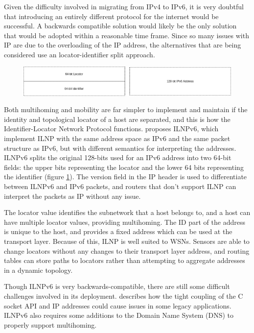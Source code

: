 \documentclass[12pt]{article}
\begin{document}
Given the difficulty involved in migrating from IPv4 to IPv6, it is very doubtful that introducing an entirely different protocol for the internet would be successful. A backwards compatible solution would likely be the only solution that would be adopted within a reasonable time frame. Since so many issues with IP are due to the overloading of the IP address, the alternatives that are being considered use an locator-identifier split approach. 

\begin{figure}[!ht]
	\centering
	\includegraphics[width=\linewidth]{images/addresses}
	\caption{}
	\label{fig:addresses}
\end{figure}

Both multihoming and mobility are far simpler to implement and maintain if the identity and topological locator of a host are separated, and this is how the Identifier-Locator Network Protocol functions. \cite{5586444} proposes ILNPv6, which implement ILNP with the same address space as IPv6 and the same packet structure as IPv6, but with different semantics for interpreting the addresses. ILNPv6 splits the original 128-bits used for an IPv6 address into two 64-bit fields: the upper bits representing the locator and the lower 64 bits representing the identifier (figure \ref{fig:addresses}). The version field in the IP header is used to differentiate between ILNPv6 and IPv6 packets, and routers that don't support ILNP can interpret the packets as IP without any issue. 

The locator value identifies the subnetwork that a host belongs to, and a host can have multiple locator values, providing multihoming. The ID part of the address is unique to the host, and provides a fixed address which can be used at the transport layer. Because of this, ILNP is well suited to WSNs. Sensors are able to change locators without any changes to their transport layer address, and routing tables can store paths to locators rather than attempting to aggregate addresses in a dynamic topology.

Though ILNPv6 is very backwards-compatible, there are still some difficult challenges involved in its deployment. \cite{ipwithoutip} describes how the tight coupling of the C socket API and IP addresses could cause issues in some legacy applications. ILNPv6 also requires some additions to the Domain Name System (DNS) to properly support multihoming. 
\end{document}
